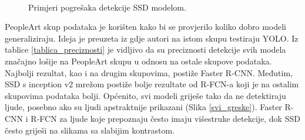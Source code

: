 \begin{figure}[H]
 \
 \
\caption{Primjeri pogrešaka detekcije SSD modelom.}
\label{ssd_greske}
\end{figure}

PeopleArt skup podataka je korišten kako bi se provjerilo koliko dobro modeli generaliziraju. Ideja je preuzeta iz \cite{DBLP:journals/corr/RedmonDGF15} gdje autori na istom skupu testiraju YOLO. Iz tablice \ref{tablica_preciznosti} je vidljivo da su preciznosti detekcije svih modela značajno lošije na PeopleArt skupu u odnosu na ostale skupove podataka. Najbolji rezultat, kao i na drugim skupovima, postiže Faster R-CNN. Međutim, SSD s inception v2 mrežom postiže bolje rezultate od R-FCN-a koji je na ostalim skupovima podataka bolji.
Općenito, svi modeli griješe tako da ne detektiraju ljude, posebno ako su ljudi apstraktnije prikazani (Slika \ref{svi_greske}). Faster R-CNN i R-FCN za ljude koje prepoznaju često imaju višestruke detekcije, dok SSD često griješi na slikama sa slabijim kontrastom.

